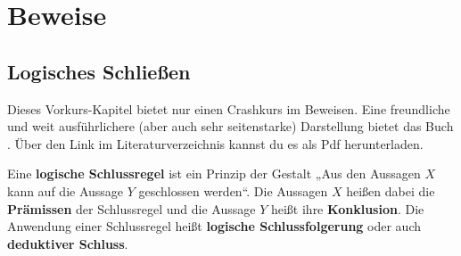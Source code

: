 


    
\chapter{Beweise} \label{kap:beweise}


\section{Logisches Schließen}


\begin{bem}[Buchtipp]
    Dieses Vorkurs-Kapitel bietet nur einen Crashkurs im Beweisen. Eine freundliche und weit ausführlichere (aber auch sehr seitenstarke) Darstellung bietet das Buch \cite{Vel06}. Über den Link im Literaturverzeichnis kannst du es als Pdf herunterladen.
\end{bem}


\begin{defin}  \label{schlussregel}
    Eine \textbf{logische Schlussregel} ist ein Prinzip der Gestalt „Aus den Aussagen $X$ kann auf die Aussage $Y$ geschlossen werden“. Die Aussagen $X$ heißen dabei die \textbf{Prämissen} der Schlussregel und die Aussage $Y$ heißt ihre \textbf{Konklusion}. Die Anwendung einer Schlussregel heißt \textbf{logische Schlussfolgerung} oder auch \textbf{deduktiver Schluss}.
\end{defin}


